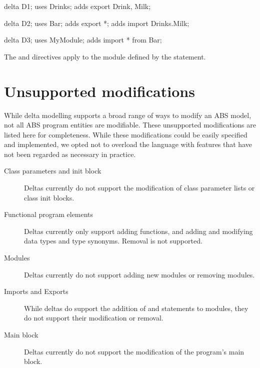 \begin{abscode}
delta D1;
uses Drinks;
adds export Drink, Milk;

delta D2;
uses Bar;
adds export *;
adds import Drinks.Milk;

delta D3;
uses MyModule;
adds import * from Bar;
\end{abscode}
%
The  and  directives apply to the
module defined by the  statement.


\section{Unsupported modifications}

While delta modelling supports a broad range of ways to modify an ABS model, not
all ABS program entities are modifiable. These unsupported modifications are
listed here for completeness. While these modifications could be easily
specified and implemented, we opted not to overload the language with features
that have not been regarded as necessary in practice.
 
\begin{description}
    \item[Class parameters and init block] Deltas currently do not support the 
    modification of class parameter lists or class init blocks.

  \item[Functional program elements] Deltas currently only support
    adding functions, and adding and modifying data types and type
    synonyms. Removal is not supported.

    \item[Modules] Deltas currently do not support adding new modules or removing modules.
    
    \item[Imports and Exports]While deltas do support the addition of  and
     statements to modules, they do not support their modification or removal.
    
    \item[Main block] Deltas currently do not support the modification of the program's main block.

\end{description}

